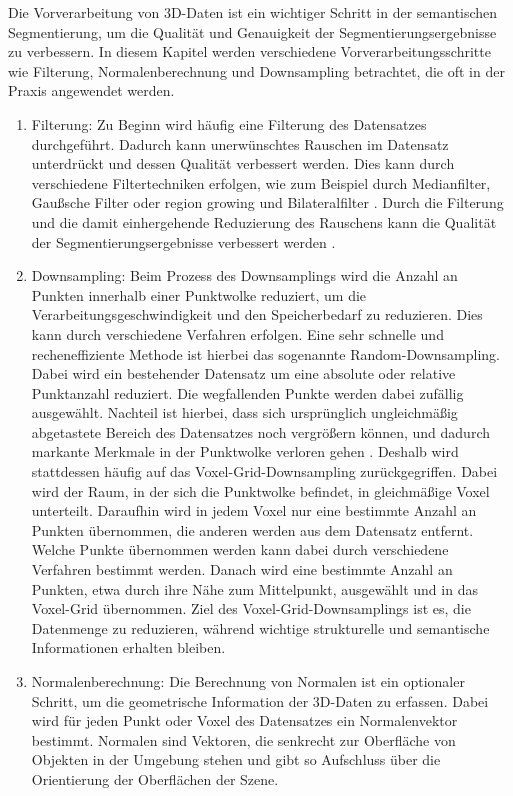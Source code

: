 Die Vorverarbeitung von 3D-Daten ist ein wichtiger Schritt in der semantischen
Segmentierung, um die Qualität und Genauigkeit der Segmentierungsergebnisse zu
verbessern. In diesem Kapitel werden verschiedene Vorverarbeitungsschritte wie
Filterung, Normalenberechnung und Downsampling betrachtet, die oft in der
Praxis angewendet werden.

\begin{enumerate}

\item Filterung: Zu Beginn wird häufig eine Filterung des Datensatzes durchgeführt.
Dadurch kann unerwünschtes Rauschen im Datensatz unterdrückt und dessen
Qualität verbessert werden. Dies kann durch verschiedene Filtertechniken
erfolgen, wie zum Beispiel durch Medianfilter, Gaußsche Filter \cite{9191237}
oder region growing und Bilateralfilter \cite{6460813}. Durch die Filterung und
die damit einhergehende Reduzierung des Rauschens kann die Qualität der
Segmentierungsergebnisse verbessert werden \cite{HAN2017103}.

\item Downsampling: Beim Prozess des Downsamplings wird die Anzahl an Punkten
innerhalb einer Punktwolke reduziert, um die Verarbeitungsgeschwindigkeit und
den Speicherbedarf zu reduzieren. Dies kann durch verschiedene Verfahren
erfolgen. Eine sehr schnelle und recheneffiziente Methode ist hierbei das
sogenannte Random-Downsampling. Dabei wird ein bestehender Datensatz um eine
absolute oder relative Punktanzahl reduziert. Die wegfallenden Punkte werden
dabei zufällig ausgewählt. Nachteil ist hierbei, dass sich ursprünglich
ungleichmäßig abgetastete Bereich des Datensatzes noch vergrößern können, und
dadurch markante Merkmale in der Punktwolke verloren gehen
\cite{987567547,2233445566}. Deshalb wird stattdessen häufig auf das
Voxel-Grid-Downsampling zurückgegriffen. Dabei wird der Raum, in der sich die
Punktwolke befindet, in gleichmäßige Voxel unterteilt. Daraufhin wird in jedem
Voxel nur eine bestimmte Anzahl an Punkten übernommen, die anderen werden aus
dem Datensatz entfernt. Welche Punkte übernommen werden kann dabei durch
verschiedene Verfahren bestimmt werden. Danach wird eine bestimmte Anzahl an
Punkten, etwa durch ihre Nähe zum Mittelpunkt, ausgewählt und in das Voxel-Grid
übernommen. Ziel des Voxel-Grid-Downsamplings ist es, die Datenmenge zu
reduzieren, während wichtige strukturelle und semantische Informationen
erhalten bleiben. %

\item Normalenberechnung: Die Berechnung von Normalen ist ein optionaler Schritt, um
die geometrische Information der 3D-Daten zu erfassen. Dabei wird für jeden
Punkt oder Voxel des Datensatzes ein Normalenvektor bestimmt. Normalen sind
Vektoren, die senkrecht zur Oberfläche von Objekten in der Umgebung stehen und
gibt so Aufschluss über die Orientierung der Oberflächen der Szene.
\cite{6375034}

\end{enumerate}

